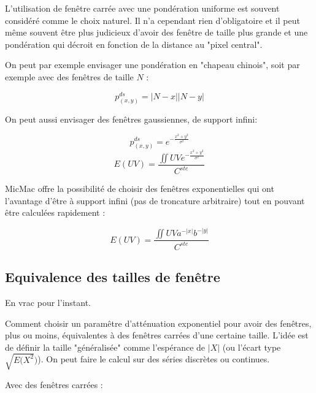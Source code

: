 \label{MecaGen:FEN:EXPO}

L'utilisation de fen\^etre carr\'ee avec une pond\'eration uniforme
est souvent consid\'er\'e comme le choix naturel. Il n'a cependant
rien d'obligatoire et il peut m\^eme souvent \^etre plus judicieux
d'avoir des fen\^etre de taille plus grande et une pond\'eration
qui d\'ecroit en fonction de la distance au "pixel central".

On peut par exemple envisager une pond\'eration en "chapeau chinois",
soit par exemple avec des fen\^etres de taille $N$ :

\begin{equation}
   p^{ds}_{(x,y)} = |N-x||N-y|
\end{equation}

On peut aussi envisager des fen\^etres gaussiennes, de support
infini:

\begin{equation}
   p^{ds}_{(x,y)} = e^{-\frac{x^2+y^2}{\sigma ^2}}
\end{equation}
\begin{equation}
    E(UV) =\frac{\iint  UV e^{-\frac{x^2+y^2}{\sigma ^2}}}{C^{ste}}
\end{equation}

MicMac offre la possibilit\'e de choisir des fen\^etres exponentielles
qui ont l'avantage d'\^etre \`a support infini (pas de troncature
arbitraire) tout en pouvant \^etre  calcul\'ees rapidement :

\begin{equation}
    E(UV) =\frac{\iint  UV a^{-|x|} b^{-|y|}}{C^{ste}}
\end{equation}


\subsection{Equivalence des tailles de fen\^etre}

En vrac pour l'instant.

Comment choisir un param\^etre d'att\'enuation exponentiel pour avoir des
fen\^etres, plus ou moins, \'equivalentes \`a des fen\^etres carr\'ees d'une
certaine taille.
L'id\'ee est de d\'efinir la taille "g\'en\'eralis\'ee"
comme l'esp\'erance de $|X|$ (ou l'\'ecart type $\sqrt{E(X^2})$).
On peut faire le calcul sur des s\'eries discr\`etes ou continues.

Avec des fen\^etres carr\'ees :


